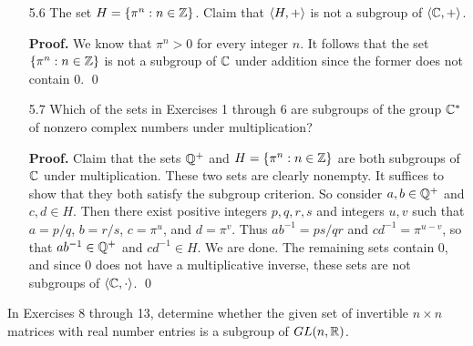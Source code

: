\begin{enumerate}
      \textbf{Proof.} $\pi\Q$ is clearly nonempty, so consider $a, b \in \pi\Q$.
      Then there exist rational numbers $p$ and $q$ such that $a = p\pi$ and
      $b = q\pi$; thus $a - b = \pi(p - q) \in \pi\Q$. Hence, by the subgroup
      criterion, $\pi\Q$ is a subgroup of $\C$ under addition. \qed
   \item[5.6]  The set $H = \{\pi^n : n \in \mathbb{Z}\}$. Claim that $\langle H, + \rangle$ is 
               not a subgroup of $\langle \mathbb{C}, + \rangle$.

      \textbf{Proof.} We know that $\pi^n > 0$ for every integer $n$. It
      follows that the set $\{\pi^n : n \in \mathbb{Z}\}$ is not a subgroup of $\C$ 
      under addition since the former does not contain 0. \qed
   \item[5.7]  Which of the sets in Exercises 1 through 6 are subgroups of the
               group $\mathbb{C}^*$ of nonzero complex numbers under multiplication?

      \textbf{Proof.} Claim that the sets $\mathbb{Q}^+$ and
      $H = \{\pi^n : n \in \mathbb{Z}\}$ are both subgroups of $\C$ under 
      multiplication. These two sets are clearly nonempty. It suffices to show 
      that they both satisfy the subgroup criterion. So consider $a, b \in \mathbb{Q}^+$
      and $c, d \in H$. Then there exist positive integers $p, q, r, s$ and
      integers $u, v$ such that $a = p/q$, $b = r/s$, $c = \pi^u$, and
      $d = \pi^v$. Thus $ab^{-1} = ps/qr$ and $cd^{-1} = \pi^{u - v}$, so that
      $ab^{-1} \in \mathbb{Q}^+$ and $cd^{-1} \in H$. We are done. The remaining sets 
      contain 0, and since 0 does not have a multiplicative inverse, these sets 
      are not subgroups of $\langle \mathbb{C}, \cdot \rangle$. \qed
\end{enumerate}

\noindent      In Exercises 8 through 13, determine whether the given set of
               invertible $n \times n$ matrices with real number entries is a
               subgroup of $GL(n, \mathbb{R})$.

